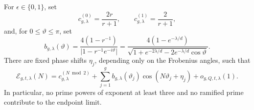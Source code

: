 \begin{lemma}
\label{lem:endpoint-decomposition}
For \(\epsilon\in\{0,1\}\), set
\begin{equation}
 c_{g,\lambda}^{(0)}=\frac{2r}{r+1},\qquad
 c_{g,\lambda}^{(1)}=\frac{2}{r+1},
\label{eq:parity-centers}
\end{equation}
and, for \(0\leq\vartheta\leq\pi\), set
\begin{equation}
 b_{g,\lambda}(\vartheta)
 =\frac{4(1-r^{-1})}
 {\lvert1-r^{-1}e^{-i\vartheta}\rvert}
 =\frac{4(1-e^{-\lambda/d})}
 {\sqrt{1+e^{-2\lambda/d}-2e^{-\lambda/d}\cos\vartheta}}.
\label{eq:finite-amplitude}
\end{equation}
There are fixed phase shifts \(\eta_j\), depending only on the Frobenius
angles, such that
\begin{equation}
 \mathcal E_{g,t,\lambda}(N)
 =c_{g,\lambda}^{(N\bmod2)}
  +\sum_{j=1}^g b_{g,\lambda}(\vartheta_j)
       \cos(N\vartheta_j+\eta_j)+o_{g,Q,t,\lambda}(1).
\label{eq:endpoint-cosine}
\end{equation}
In particular, no prime powers of exponent at least three and no ramified
prime contribute to the endpoint limit.
\end{lemma}

